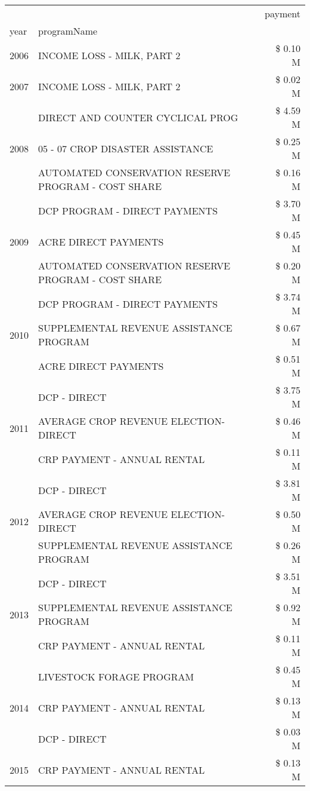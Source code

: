 \begin{tabular}{llr}
\toprule
 &  & payment \\
year & programName &  \\
\midrule
2006 & INCOME LOSS - MILK, PART 2 & \$ 0.10 M \\
\cline{1-3}
2007 & INCOME LOSS - MILK, PART 2 & \$ 0.02 M \\
\cline{1-3}
\multirow[t]{3}{*}{2008} & DIRECT AND COUNTER CYCLICAL PROG & \$ 4.59 M \\
 & 05 - 07 CROP DISASTER ASSISTANCE & \$ 0.25 M \\
 & AUTOMATED CONSERVATION RESERVE PROGRAM - COST SHARE & \$ 0.16 M \\
\cline{1-3}
\multirow[t]{3}{*}{2009} & DCP PROGRAM - DIRECT PAYMENTS & \$ 3.70 M \\
 & ACRE DIRECT PAYMENTS & \$ 0.45 M \\
 & AUTOMATED CONSERVATION RESERVE PROGRAM - COST SHARE & \$ 0.20 M \\
\cline{1-3}
\multirow[t]{3}{*}{2010} & DCP PROGRAM - DIRECT PAYMENTS & \$ 3.74 M \\
 & SUPPLEMENTAL REVENUE ASSISTANCE PROGRAM & \$ 0.67 M \\
 & ACRE DIRECT PAYMENTS & \$ 0.51 M \\
\cline{1-3}
\multirow[t]{3}{*}{2011} & DCP - DIRECT & \$ 3.75 M \\
 & AVERAGE CROP REVENUE ELECTION-DIRECT & \$ 0.46 M \\
 & CRP PAYMENT - ANNUAL RENTAL & \$ 0.11 M \\
\cline{1-3}
\multirow[t]{3}{*}{2012} & DCP - DIRECT & \$ 3.81 M \\
 & AVERAGE CROP REVENUE ELECTION-DIRECT & \$ 0.50 M \\
 & SUPPLEMENTAL REVENUE ASSISTANCE PROGRAM & \$ 0.26 M \\
\cline{1-3}
\multirow[t]{3}{*}{2013} & DCP - DIRECT & \$ 3.51 M \\
 & SUPPLEMENTAL REVENUE ASSISTANCE PROGRAM & \$ 0.92 M \\
 & CRP PAYMENT - ANNUAL RENTAL & \$ 0.11 M \\
\cline{1-3}
\multirow[t]{3}{*}{2014} & LIVESTOCK FORAGE PROGRAM & \$ 0.45 M \\
 & CRP PAYMENT - ANNUAL RENTAL & \$ 0.13 M \\
 & DCP - DIRECT & \$ 0.03 M \\
\cline{1-3}
\multirow[t]{3}{*}{2015} & CRP PAYMENT - ANNUAL RENTAL & \$ 0.13 M \\

\end{tabular}
